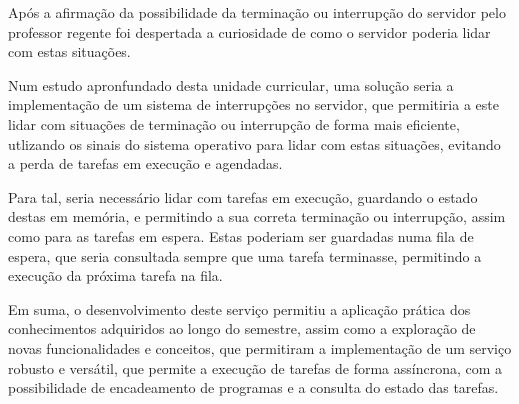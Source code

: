 \documentclass[a4paper,11pt]{scrreprt}
\begin{document}
    Após a afirmação da possibilidade da terminação ou interrupção do servidor
    pelo professor regente foi despertada a curiosidade de como o servidor
    poderia lidar com estas situações.

    Num estudo apronfundado desta unidade curricular, uma solução seria a
    implementação de um sistema de interrupções no servidor, que permitiria
    a este lidar com situações de terminação ou interrupção de forma mais
    eficiente, utlizando os sinais do sistema operativo para lidar com estas
    situações, evitando a perda de tarefas em execução e agendadas.

    Para tal, seria necessário lidar com tarefas em execução, guardando
    o estado destas em memória, e permitindo a sua correta terminação
    ou interrupção, assim como para as tarefas em espera. Estas poderiam
    ser guardadas numa fila de espera, que seria consultada sempre que
    uma tarefa terminasse, permitindo a execução da próxima tarefa na
    fila.

    Em suma, o desenvolvimento deste serviço permitiu a aplicação prática
    dos conhecimentos adquiridos ao longo do semestre, assim como a
    exploração de novas funcionalidades e conceitos, que permitiram
    a implementação de um serviço robusto e versátil, que permite a
    execução de tarefas de forma assíncrona, com a possibilidade de
    encadeamento de programas e a consulta do estado das tarefas.







\end{document}
